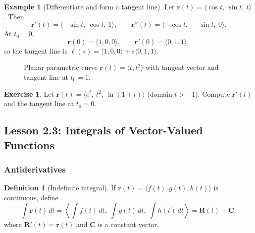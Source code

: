 \documentclass[12pt]{article}
\numberwithin{equation}{section}
\newcommand{\vect}[1]{\boldsymbol{#1}}   %
\theoremstyle{plain}
\theoremstyle{definition}
\newtheorem{definition}[theorem]{Definition}
\newtheorem{example}[theorem]{Example}
\newtheorem{exercise}[theorem]{Exercise}
\theoremstyle{remark}
\begin{document}
\begin{example}[Differentiate and form a tangent line]
Let $\vect r(t)=\langle \cos t,\ \sin t,\ t\rangle$.
Then
\[
\vect r'(t)=\langle -\sin t,\ \cos t,\ 1\rangle,\qquad
\vect r''(t)=\langle -\cos t,\ -\sin t,\ 0\rangle.
\]
At $t_0=0$,
\[
\vect r(0)=\langle 1,0,0\rangle,\qquad
\vect r'(0)=\langle 0,1,1\rangle,
\]
so the tangent line is $\vect \ell(s)=\langle 1,0,0\rangle+s\langle 0,1,1\rangle$.
\end{example}

\begin{figure}[H]
\centering
{}
\caption{Planar parametric curve $\vect r(t)=\langle t,t^2\rangle$ with tangent vector and tangent line at $t_0=1$.}
\label{fig:tangent2d}
\end{figure}

\begin{exercise}
Let $\vect r(t)=\langle e^t,\ t^2,\ \ln(1+t)\rangle$ (domain $t>-1$).
Compute $\vect r'(t)$ and the tangent line at $t_0=0$.
\end{exercise}


\subsection{Lesson 2.3: Integrals of Vector-Valued Functions}

\subsubsection{Antiderivatives}

\begin{definition}[Indefinite integral]
If $\vect r(t)=\langle f(t),g(t),h(t)\rangle$ is continuous, define
\[
\int \vect r(t)\,dt
=
\left\langle \int f(t)\,dt,\ \int g(t)\,dt,\ \int h(t)\,dt \right\rangle
=
\vect R(t)+\vect C,
\]
where $\vect R'(t)=\vect r(t)$ and $\vect C$ is a constant vector.
\end{definition}
\end{document}

